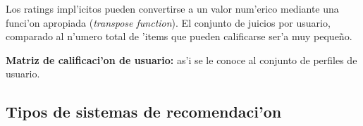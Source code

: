 \documentclass[11pt]{article}
\begin{document}
Los ratings impl'icitos pueden convertirse a un valor num'erico mediante una funci'on apropiada (\textit{transpose function}). El conjunto de juicios por usuario, comparado al n'umero total de 'items que pueden calificarse ser'a muy peque\~{n}o.

\smallskip
\textbf{Matriz de calificaci'on de usuario:} as'i se le conoce al conjunto de perfiles de usuario.







\subsection{Tipos de sistemas de recomendaci'on}
\end{document}
